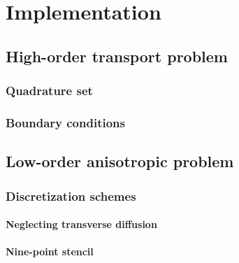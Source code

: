 
\chapter{Implementation}

\section{High-order transport problem}

\subsection{Quadrature set}

\subsection{Boundary conditions}

\section{Low-order anisotropic problem}

\subsection{Discretization schemes}

\subsubsection{Neglecting transverse diffusion}

\subsubsection{Nine-point stencil}

